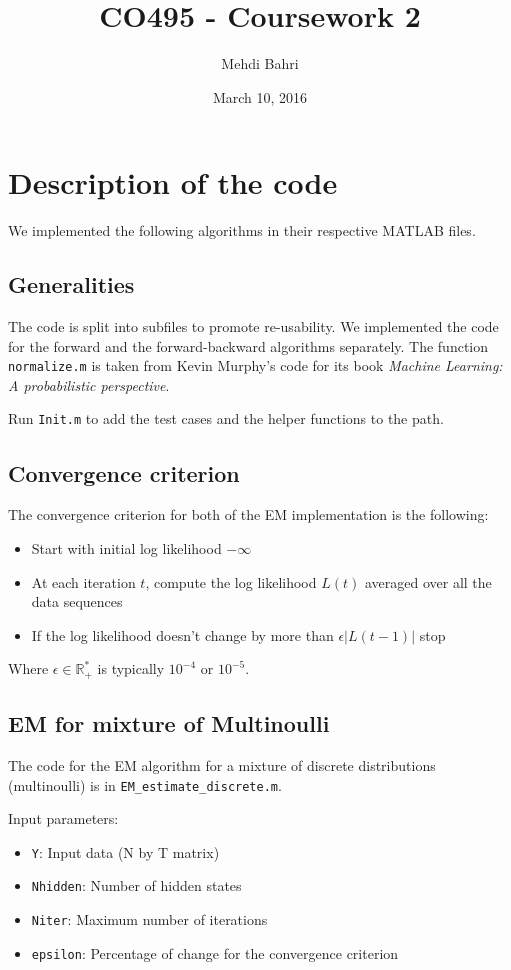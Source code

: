 \documentclass[10pt, a4paper]{article}
\title{CO495 - Coursework 2}
\author{Mehdi Bahri}
\date{March 10, 2016}
\begin{document}
\maketitle

\tableofcontents

\section{Description of the code}
We implemented the following algorithms in their respective MATLAB files.

\subsection{Generalities}
The code is split into subfiles to promote re-usability. We implemented the code for the forward and the forward-backward algorithms separately. The function \texttt{normalize.m} is taken from Kevin Murphy's code for its book \textit{Machine Learning: A probabilistic perspective}.

Run \texttt{Init.m} to add the test cases and the helper functions to the path.

\subsection{Convergence criterion}
The convergence criterion for both of the EM implementation is the following:
\begin{itemize}
\item Start with initial log likelihood $- \infty$
\item At each iteration $t$, compute the log likelihood $L(t)$ averaged over all the data sequences
\item If the log likelihood doesn't change by more than $\epsilon |L(t-1)|$ stop
\end{itemize}
Where $\epsilon \in \mathbb{R}_+^*$ is typically $10^{-4}$ or $10^{-5}$.
\subsection{EM for mixture of Multinoulli}
The code for the EM algorithm for a mixture of discrete distributions (multinoulli) is in \texttt{EM\_estimate\_discrete.m}.

Input parameters:
\begin{itemize}
\item \texttt{Y}: Input data (N by T matrix)
\item \texttt{Nhidden}: Number of hidden states
\item \texttt{Niter}: Maximum number of iterations
\item \texttt{epsilon}: Percentage of change for the convergence criterion
\end{itemize}
\end{document}
